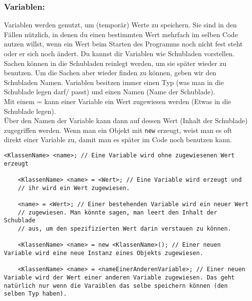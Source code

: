 \begin{Infobox}
	\subsubsection*{Variablen:}
	Variablen werden genutzt, um (temporär) Werte zu speichern.
	Sie sind in den Fällen nützlich, in denen du einen bestimmten Wert mehrfach im selben Code nutzen willst, wenn ein Wert beim Starten des Programms noch nicht fest steht oder er sich noch ändert.\newline
	Du kannst dir Variablen wie Schubladen vorstellen. Sachen können in die Schubladen reinlegt werden, um sie später wieder zu benutzen. Um die Sachen aber wieder finden zu können, geben wir den Schubladen Namen.\newline
	Variablen besitzen immer einen Typ (was man in die Schublade legen darf/ passt) und einen Namen (Name der Schublade).\\
	Mit einem = kann einer Variable ein Wert zugewiesen werden (Etwas in die Schublade legen).\\
	Über den Namen der Variable kann dann auf dessen Wert (Inhalt der Schublade) zugegriffen werden.\newline
	Wenn man ein Objekt mit \lstinline{new} erzeugt, weist man es oft direkt einer Variable zu, damit man es später im Code noch benutzen kann.
\end{Infobox}

\newpage

\begin{lstlisting}[title=\textbf{Variablen Syntax}]
	<KlassenName> <name>; // Eine Variable wird ohne zugewiesenen Wert erzeugt

	<KlassenName> <name> = <Wert>; // Eine Variable wird erzeugt und
	// ihr wird ein Wert zugewiesen.

	<name> = <Wert>; // Einer bestehenden Variable wird ein neuer Wert
	// zugewiesen. Man könnte sagen, man leert den Inhalt der Schublade
	// aus, um den spezifizierten Wert darin verstauen zu können.

	<KlassenName> <name> = new <KlassenName>(); // Einer neuen Variable wird eine neue Instanz eines Objekts zugewiesen.

	<KlassenName> <name> = <nameEinerAnderenVariable>; // Einer neuen Variable wird der Wert einer anderen Variable zugewiesen. Das geht natürlich nur wenn die Varaiblen das selbe speichern können (den selben Typ haben).
\end{lstlisting}

